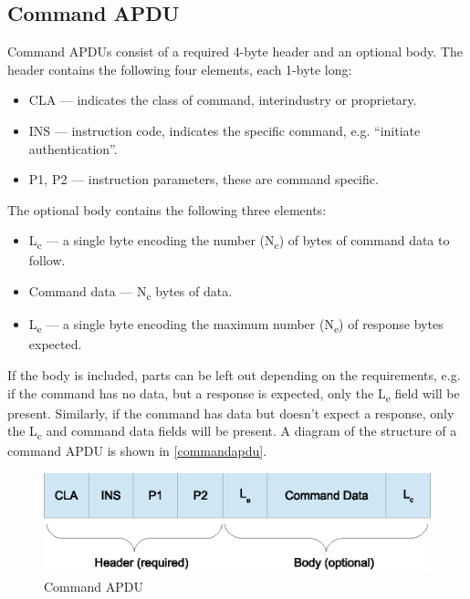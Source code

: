 \documentclass[12pt,a4paper,twoside,openright]{report}
\begin{document}
\subsection{Command APDU}

Command APDUs consist of a required 4-byte header and an optional body. The header contains the following four elements, each 1-byte long:

\begin{itemize}
\item CLA --- indicates the class of command, interindustry or proprietary.
\item INS --- instruction code, indicates the specific command, e.g. ``initiate authentication''.
\item P1, P2 --- instruction parameters, these are command specific.
\end{itemize}

\noindent
The optional body contains the following three elements:

\begin{itemize}
\item L\textsubscript{c} --- a single byte encoding the number (N\textsubscript{c}) of bytes of command data to follow.
\item Command data --- N\textsubscript{c} bytes of data.
\item L\textsubscript{e} --- a single byte encoding the maximum number (N\textsubscript{e}) of response bytes expected.
\end{itemize}

\noindent
If the body is included, parts can be left out depending on the requirements, e.g. if the command has no data, but a response is expected, only the L\textsubscript{e} field will be present. Similarly, if the command has data but doesn't expect a response, only the L\textsubscript{c} and command data fields will be present. A diagram of the structure of a command APDU is shown in \autoref{commandapdu}.

\begin{figure}[tbh]
\centerline{\includegraphics{figures/commandapdu.eps}}
\caption{Command APDU}
\label{commandapdu}
\end{figure}
\end{document}
